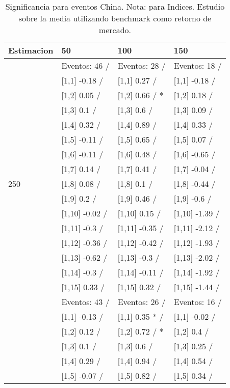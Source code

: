 \begin{table}

\caption{Significancia para eventos China. Nota: para Indices. Estudio sobre la media utilizando benchmark como retorno de mercado.}
\centering
\begin{tabular}[t]{llll}
\toprule
Estimacion & 50 & 100 & 150\\
\midrule
 & Eventos:  46 / & Eventos:  28 / & Eventos:  18 /\\
 & {}[1,1] -0.18  / & {}[1,1] 0.27  / & {}[1,1] -0.18  /\\
 & {}[1,2] 0.05  / & {}[1,2] 0.66  / * & {}[1,2] 0.18  /\\
 & {}[1,3] 0.1  / & {}[1,3] 0.6  / & {}[1,3] 0.09  /\\
 & {}[1,4] 0.32  / & {}[1,4] 0.89  / & {}[1,4] 0.33  /\\
\addlinespace
 & {}[1,5] -0.11  / & {}[1,5] 0.65  / & {}[1,5] 0.07  /\\
 & {}[1,6] -0.11  / & {}[1,6] 0.48  / & {}[1,6] -0.65  /\\
 & {}[1,7] 0.14  / & {}[1,7] 0.41  / & {}[1,7] -0.04  /\\
250 & {}[1,8] 0.08  / & {}[1,8] 0.1  / & {}[1,8] -0.44  /\\
 & {}[1,9] 0.2  / & {}[1,9] 0.46  / & {}[1,9] -0.6  /\\
\addlinespace
 & {}[1,10] -0.02  / & {}[1,10] 0.15  / & {}[1,10] -1.39  /\\
 & {}[1,11] -0.3  / & {}[1,11] -0.35  / & {}[1,11] -2.12  /\\
 & {}[1,12] -0.36  / & {}[1,12] -0.42  / & {}[1,12] -1.93  /\\
 & {}[1,13] -0.62  / & {}[1,13] -0.3  / & {}[1,13] -2.02  /\\
 & {}[1,14] -0.3  / & {}[1,14] -0.11  / & {}[1,14] -1.92  /\\
\addlinespace
 & {}[1,15] 0.33  / & {}[1,15] 0.32  / & {}[1,15] -1.44  /\\
 & Eventos:  43 / & Eventos:  26 / & Eventos:  16 /\\
 & {}[1,1] -0.13  / & {}[1,1] 0.35 * / & {}[1,1] -0.02  /\\
 & {}[1,2] 0.12  / & {}[1,2] 0.72  / * & {}[1,2] 0.4  /\\
 & {}[1,3] 0.1  / & {}[1,3] 0.6  / & {}[1,3] 0.25  /\\
\addlinespace
 & {}[1,4] 0.29  / & {}[1,4] 0.94  / & {}[1,4] 0.54  /\\
 & {}[1,5] -0.07  / & {}[1,5] 0.82  / & {}[1,5] 0.34  /\\

\end{tabular}
\end{table}
